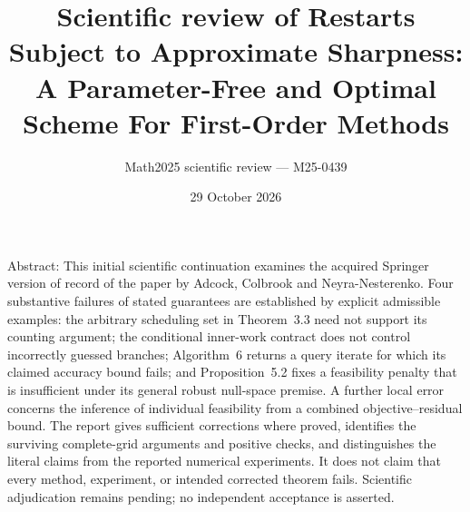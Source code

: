 \documentclass[10pt]{article}
\title{Scientific review of
Restarts Subject to Approximate Sharpness:
A Parameter-Free and Optimal Scheme
For First-Order Methods}
\author{Math2025 scientific review — M25-0439}
\date{29 October 2026}
\begin{document}
\maketitle
Abstract: This initial scientific continuation examines the acquired Springer version of record of the paper by Adcock, Colbrook and Neyra-Nesterenko. Four substantive failures of stated guarantees are established by explicit admissible examples: the arbitrary scheduling set in Theorem 3.3 need not support its counting argument; the conditional inner-work contract does not control incorrectly guessed branches; Algorithm 6 returns a query iterate for which its claimed accuracy bound fails; and Proposition 5.2 fixes a feasibility penalty that is insufficient under its general robust null-space premise. A further local error concerns the inference of individual feasibility from a combined objective–residual bound. The report gives sufficient corrections where proved, identifies the surviving complete-grid arguments and positive checks, and distinguishes the literal claims from the reported numerical experiments. It does not claim that every method, experiment, or intended corrected theorem fails. Scientific adjudication remains pending; no independent acceptance is asserted.\par
\end{document}
